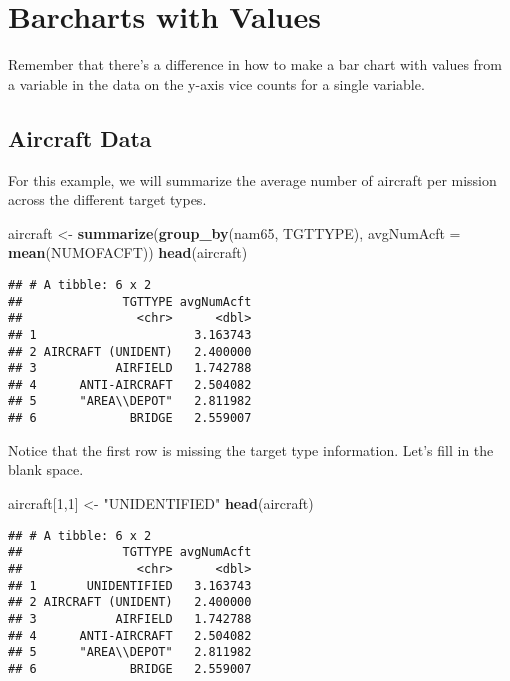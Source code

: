 \documentclass[oneside]{memoir}
\newenvironment{Shaded}{\begin{snugshade}}{\end{snugshade}}
\newcommand{\KeywordTok}[1]{\textcolor[rgb]{0.13,0.29,0.53}{\textbf{#1}}}
\newcommand{\DataTypeTok}[1]{\textcolor[rgb]{0.13,0.29,0.53}{#1}}
\newcommand{\DecValTok}[1]{\textcolor[rgb]{0.00,0.00,0.81}{#1}}
\newcommand{\StringTok}[1]{\textcolor[rgb]{0.31,0.60,0.02}{#1}}
\newcommand{\NormalTok}[1]{#1}
\theoremstyle{definition}
\theoremstyle{definition}
\theoremstyle{definition}
\theoremstyle{remark}
\begin{document}
\chapter{Barcharts with Values}\label{barcharts-with-values}

Remember that there's a difference in how to make a bar chart with
values from a variable in the data on the y-axis vice counts for a
single variable.

\section{Aircraft Data}\label{aircraft-data}

For this example, we will summarize the average number of aircraft per
mission across the different target types.

\begin{Shaded}
\begin{Highlighting}[]
\NormalTok{aircraft <-}\StringTok{ }\KeywordTok{summarize}\NormalTok{(}\KeywordTok{group_by}\NormalTok{(nam65, TGTTYPE), }\DataTypeTok{avgNumAcft =} \KeywordTok{mean}\NormalTok{(NUMOFACFT))}
\KeywordTok{head}\NormalTok{(aircraft)}
\end{Highlighting}
\end{Shaded}

\begin{verbatim}
## # A tibble: 6 x 2
##              TGTTYPE avgNumAcft
##                <chr>      <dbl>
## 1                      3.163743
## 2 AIRCRAFT (UNIDENT)   2.400000
## 3           AIRFIELD   1.742788
## 4      ANTI-AIRCRAFT   2.504082
## 5      "AREA\\DEPOT"   2.811982
## 6             BRIDGE   2.559007
\end{verbatim}

Notice that the first row is missing the target type information. Let's
fill in the blank space.

\begin{Shaded}
\begin{Highlighting}[]
\NormalTok{aircraft[}\DecValTok{1}\NormalTok{,}\DecValTok{1}\NormalTok{] <-}\StringTok{ "UNIDENTIFIED"}
\KeywordTok{head}\NormalTok{(aircraft)}
\end{Highlighting}
\end{Shaded}

\begin{verbatim}
## # A tibble: 6 x 2
##              TGTTYPE avgNumAcft
##                <chr>      <dbl>
## 1       UNIDENTIFIED   3.163743
## 2 AIRCRAFT (UNIDENT)   2.400000
## 3           AIRFIELD   1.742788
## 4      ANTI-AIRCRAFT   2.504082
## 5      "AREA\\DEPOT"   2.811982
## 6             BRIDGE   2.559007
\end{verbatim}
\end{document}
